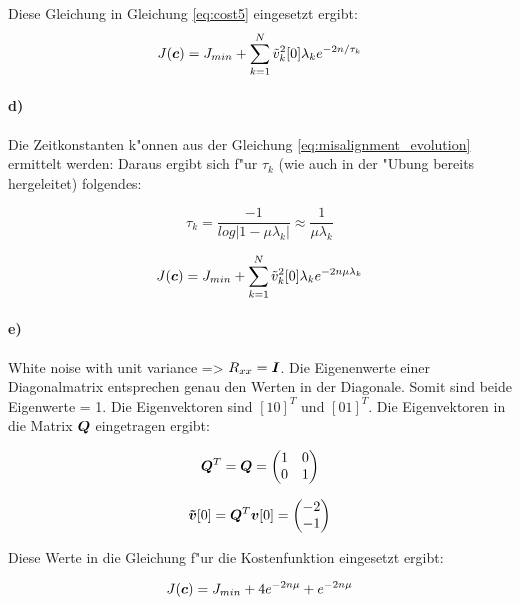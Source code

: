 Diese Gleichung in Gleichung \ref{eq:cost5} eingesetzt ergibt:
\begin{equation}
 J(\bm{c}) = J_{min} + \sum_{k=1}^N \tilde{v}_k^2[0] \lambda_k e^{-2n/\tau_k}
\label{eq:cost6}
\end{equation}

\paragraph{d)}

Die Zeitkonstanten k"onnen aus der Gleichung \ref{eq:misalignment_evolution} ermittelt werden:
Daraus ergibt sich f"ur $\tau_k$ (wie auch in der "Ubung bereits hergeleitet) folgendes:

\begin{equation}
 \tau_k = \frac{-1}{log|1-\mu \lambda_k|}  \approx \frac{1}{\mu \lambda_k}
\end{equation}

\begin{equation}
 J(\bm{c}) = J_{min} + \sum_{k=1}^N \tilde{v}_k^2[0] \lambda_k e^{-2n \mu \lambda_k}
\label{eq:cost7}
\end{equation}

\paragraph{e)}

White noise with unit variance => $R_{xx} = \bm{I}$. Die Eigenenwerte einer Diagonalmatrix entsprechen genau
den Werten in der Diagonale. Somit sind beide Eigenwerte = 1.
Die Eigenvektoren sind $[1 0]^T$ und $[0 1]^T$. Die Eigenvektoren in die Matrix $\bm{Q}$ eingetragen ergibt:

\begin{equation}
 \bm{Q}^T = \bm{Q} = \begin{pmatrix} 1 & 0 \\ 0 & 1 \end{pmatrix}
\end{equation}

\begin{equation}
 \bm{\tilde{v}}[0] = \bm{Q}^T \bm{v}[0] = \begin{pmatrix} -2 \\ -1 \end{pmatrix}
\end{equation}

Diese Werte in die Gleichung f"ur die Kostenfunktion eingesetzt ergibt:

\begin{equation}
 J(\bm{c}) = J_{min} + 4e^{-2n\mu} + e^{-2n\mu}
\label{eq:cost_example}
\end{equation}
